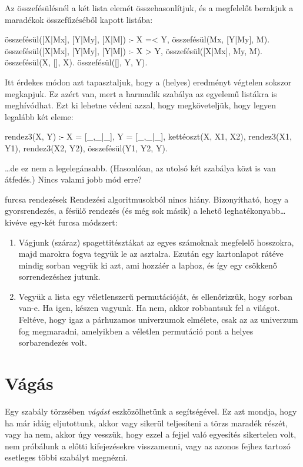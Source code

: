 Az összefésülésnél a két lista elemét
összehasonlítjuk, és a megfelelőt berakjuk a
maradékok összefűzéséből kapott listába:
\begin{program}
összefésül([X|Mx], [Y|My], [X|M]) :-
    X =< Y, összefésül(Mx, [Y|My], M).
összefésül([X|Mx], [Y|My], [Y|M]) :-
    X > Y, összefésül([X|Mx], My, M).
összefésül(X, [], X).
összefésül([], Y, Y).
\end{program}

Itt érdekes módon azt tapasztaljuk, hogy a (helyes)
eredményt végtelen sokszor megkapjuk. Ez azért van,
mert a  harmadik szabálya az egyelemű
listákra is meghívódhat. Ezt ki lehetne védeni
azzal, hogy megköveteljük, hogy legyen legalább két
eleme:
\begin{program}
rendez3(X, Y) :-
    X = [_,_|_], Y = [_,_|_],
    kettéoszt(X, X1, X2),
    rendez3(X1, Y1),
    rendez3(X2, Y2),
    összefésül(Y1, Y2, Y).
\end{program}
\dots de ez nem a legelegánsabb. (Hasonlóan, az
 utolsó két szabálya közt is van
átfedés.) Nincs valami jobb mód erre?

\begin{infobox}{}{furcsa rendezések}
Rendezési algoritmusokból nincs hiány. Bizonyítható,
hogy a gyorsrendezés, a fésülő rendezés (és még sok
másik) a lehető leghatékonyabb\dots kivéve egy-két
furcsa módszert:
\begin{enumerate}
\item Vágjunk (száraz) spagettitésztákat az egyes
  számoknak megfelelő hosszokra, majd marokra fogva
  tegyük le az asztalra. Ezután egy kartonlapot
  rátéve mindig sorban vegyük ki azt, ami hozzáér a
  laphoz, és így egy csökkenő sorrendezéshez jutunk.
\item Vegyük a lista egy véletlenszerű
  permutációját, és ellenőrizzük, hogy sorban
  van-e. Ha igen, készen vagyunk. Ha nem, akkor
  robbantsuk fel a világot. Feltéve, hogy igaz a
  párhuzamos univerzumok elmélete, csak az az
  univerzum fog megmaradni, amelyikben a véletlen
  permutáció pont a helyes sorbarendezés volt.
\end{enumerate}
\end{infobox}      

\section{Vágás}
Egy szabály törzsében \emph{vágást} eszközölhetünk a
\pr{!} segítségével. Ez azt mondja, hogy ha már
idáig eljutottunk, akkor vagy sikerül teljesíteni a
törzs maradék részét, vagy ha nem, akkor úgy
vesszük, hogy ezzel a fejjel való egyesítés
sikertelen volt, nem próbálunk a \pr{!} előtti
kifejezésekre visszamenni, vagy az azonos fejhez
tartozó esetleges többi szabályt megnézni.

